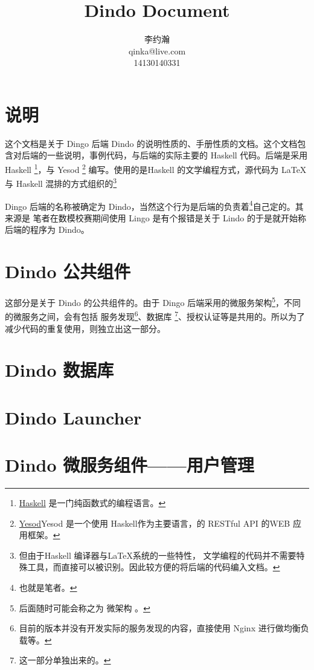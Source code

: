 \documentclass{dingo}
\title{Dindo Document}
\author{李约瀚\\qinka@live.com\\14130140331}
\begin{document}
	\makecover
	\makecontent
  \section{说明}
  这个文档是关于 Dingo 后端 Dindo 的说明性质的、手册性质的文档。这个文档包含对后端的一些说明，事例代码，与后端的实际主要的 Haskell
  代码。后端是采用 Haskell \footnote{\href{https://www.haskell.org}{Haskell} 是一门纯函数式的编程语言。}，与 Yesod 
  \footnote{\href{http://www.yesodweb.com}{Yesod}Yesod 是一个使用 Haskell作为主要语言，的 RESTful API 的WEB 应用框架。}
  编写。使用的是Haskell 的文学编程方式，源代码为 \LaTeX 与 Haskell 混排的方式组织的\footnote{但由于Haskell 编译器与\LaTeX 系统的一些特性，
  	文学编程的代码并不需要特殊工具，而直接可以被识别。因此较方便的将后端的代码编入文档。}
  
  Dingo 后端的名称被确定为 Dindo，当然这个行为是后端的负责着\footnote{也就是笔者。}自己定的。其来源是 笔者在数模校赛期间使用
  Lingo 是有个报错是关于 Lindo 的于是就开始称后端的程序为 Dindo。
  
  \section{Dindo 公共组件}
  这部分是关于 Dindo 的公共组件的。由于 Dingo 后端采用的微服务架构\footnote{后面随时可能会称之为 微架构 。}，不同的微服务之间，会有包括
  服务发现\footnote{目前的版本并没有开发实际的服务发现的内容，直接使用 Nginx 进行做均衡负载等。}、数据库
  \footnote{这一部分单独出来的。}、授权认证等是共用的。所以为了减少代码的重复使用，则独立出这一部分。
  
  \section{Dindo 数据库}
  
  \section{Dindo Launcher}
  
  \section{Dindo 微服务组件——用户管理}
\end{document}
